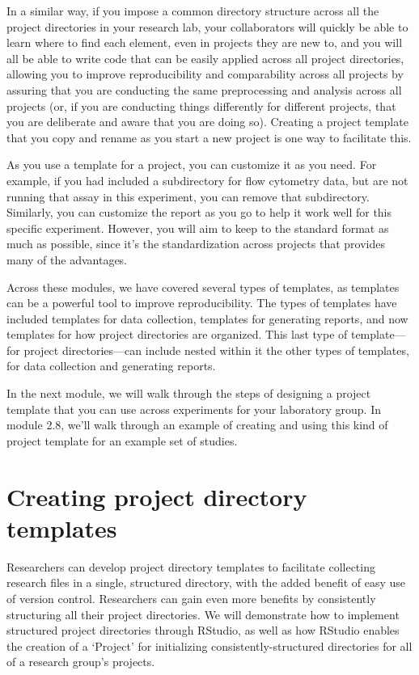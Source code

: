\documentclass[]{tufte-book}
\begin{document}
In a similar way, if you impose a common directory structure across all the
project directories in your research lab, your collaborators will quickly be
able to learn where to find each element, even in projects they are new to, and
you will all be able to write code that can be easily applied across all project
directories, allowing you to improve reproducibility and comparability across
all projects by assuring that you are conducting the same preprocessing and
analysis across all projects (or, if you are conducting things differently for
different projects, that you are deliberate and aware that you are doing so).
Creating a project template that you copy and rename as you start a new
project is one way to facilitate this.

As you use a template for a project, you can customize it as you need. For
example, if you had included a subdirectory for flow cytometry data, but are not
running that assay in this experiment, you can remove that subdirectory.
Similarly, you can customize the report as you go to help it work well for this
specific experiment. However, you will aim to keep to the standard format as
much as possible, since it's the standardization across projects that provides
many of the advantages.

Across these modules, we have covered several types of templates, as templates
can be a powerful tool to improve reproducibility. The types of templates have
included templates for data collection, templates for generating reports, and
now templates for how project directories are organized. This last type of template---
for project directories---can include nested within it the other types of
templates, for data collection and generating reports.

In the next module, we will walk through the steps of designing a project
template that you can use across experiments for your laboratory group. In
module 2.8, we'll walk through an example of creating and using this kind of
project template for an example set of studies.

\section{Creating project directory templates}\label{module7}

Researchers can develop project directory templates to facilitate collecting research
files in a single, structured directory, with the added benefit of easy use of
version control. Researchers can gain even more benefits by consistently
structuring all their project directories. We will demonstrate how to
implement structured project directories through RStudio, as well as how RStudio
enables the creation of a `Project' for initializing consistently-structured
directories for all of a research group's projects.
\end{document}
